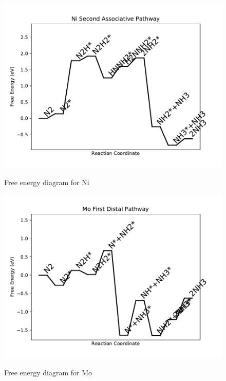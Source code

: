 \documentclass{article}
\begin{document}
\begin{figure}
\includegraphics[width=1\linewidth]{data/plots/Ni_associative_2.pdf}
\label{fig:Ni_associative_2}
\caption{Free energy diagram for Ni}
\end{figure}

\clearpage
\begin{figure}
\includegraphics[width=1\linewidth]{data/plots/Mo_distal_1.pdf}
\label{fig:Mo_distal_1}
\caption{Free energy diagram for Mo}
\end{figure}
\end{document}
